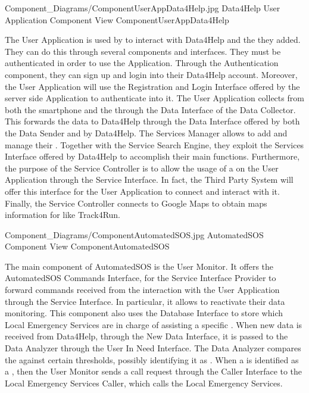 \documentclass[../../DD.tex]{subfiles}
\begin{document}
	\image {13cm} {Component_Diagrams/ComponentUserAppData4Help.jpg} {Data4Help User Application Component View} {ComponentUserAppData4Help}

	The User Application is used by  to interact with Data4Help and the  they added. They can do this through several components and interfaces. They must be authenticated in order to use the Application. Through the Authentication component, they can sign up and login into their Data4Help account. Moreover, the User Application will use the Registration and Login Interface offered by the server side Application to authenticate into it.
	The User Application collects  from both the smartphone and the  through the Data Interface of the Data Collector. This forwards the data to Data4Help through the Data Interface offered by both the Data Sender and by Data4Help.
	The Services Manager allows  to add and manage their . Together with the Service Search Engine, they exploit the Services Interface offered by Data4Help to accomplish their main functions.
	Furthermore, the purpose of the Service Controller is to allow the usage of a  on the User Application through the Service Interface. In fact, the Third Party System will offer this interface for the User Application to connect and interact with it. Finally, the Service Controller connects to Google Maps to obtain maps information for  like Track4Run.

	\image {13cm} {Component_Diagrams/ComponentAutomatedSOS.jpg} {AutomatedSOS Component View} {ComponentAutomatedSOS}

	The main component of AutomatedSOS is the User Monitor. It offers the AutomatedSOS Commands Interface, for the Service Interface Provider to forward commands received from the interaction with the User Application through the Service Interface. In particular, it allows  to reactivate their data monitoring. This component also uses the Database Interface to store which Local Emergency Services are in charge of assisting a specific .
	When new data is received from Data4Help, through the New Data Interface, it is passed to the Data Analyzer through the User In Need Interface. The Data Analyzer compares the  against certain thresholds, possibly identifying it as . When a  is identified as a , then the User Monitor sends a call request through the Caller Interface to the Local Emergency Services Caller, which calls the Local Emergency Services.
\end{document}
